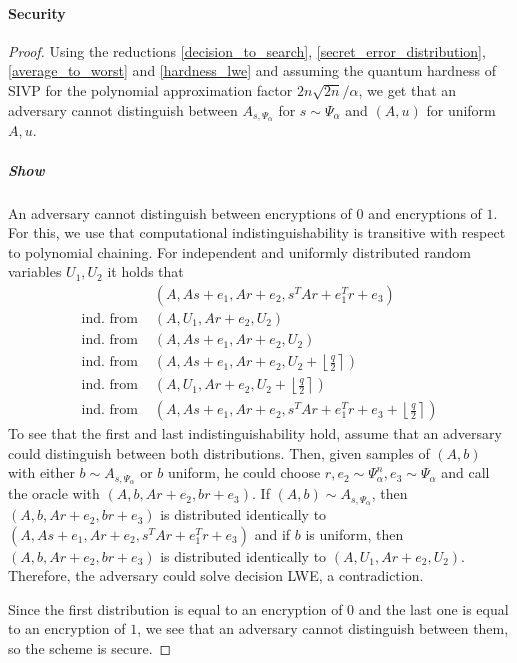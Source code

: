 \documentclass{report}
\begin{document}
\paragraph{Security}
\begin{proof}
Using the reductions \ref{decision_to_search}, \ref{secret_error_distribution}, \ref{average_to_worst} and \ref{hardness_lwe} and assuming the quantum hardness of SIVP for the polynomial approximation factor $2n\sqrt{2n}/\alpha$, we get that an adversary cannot distinguish between $A_{s, \Psi_\alpha}$ for $s \sim \Psi_\alpha$ and $(A, u)$ for uniform $A, u$.
\subparagraph{Show} An adversary cannot distinguish between encryptions of $0$ and encryptions of $1$. For this, we use that computational indistinguishability is transitive with respect to polynomial chaining. For independent and uniformly distributed random variables $U_1, U_2$ it holds that
\begin{equation}
\begin{split}
&\left(A, As + e_1, Ar + e_2, s^TAr + e_1^Tr + e_3 \right) \\
\text{ind. from } & \left(A, U_1, Ar + e_2, U_2 \right) \\
\text{ind. from } & \left(A, As + e_1, Ar + e_2, U_2 \right) \\
\text{ind. from } & \left(A, As + e_1, Ar + e_2, U_2 + \left\lfloor \frac q 2 \right\rceil \right) \\
\text{ind. from } & \left(A, U_1, Ar + e_2, U_2 + \left\lfloor \frac q 2 \right\rceil \right) \\
\text{ind. from } & \left(A, As + e_1, Ar + e_2, s^TAr + e_1^Tr + e_3 + \left\lfloor \frac q 2 \right\rceil \right)
\end{split} \nonumber
\end{equation}
To see that the first and last indistinguishability hold, assume that an adversary could distinguish between both distributions. Then, given samples of $(A, b)$ with either $b \sim A_{s, \Psi_\alpha}$ or $b$ uniform, he could choose $r, e_2 \sim \Psi_\alpha^n, e_3 \sim \Psi_\alpha$ and call the oracle with $(A, b, Ar + e_2, br + e_3)$. If $(A, b) \sim A_{s, \Psi_\alpha}$, then $(A, b, Ar + e_2, br + e_3)$ is distributed identically to $(A, As + e_1, Ar + e_2, s^TAr + e_1^Tr + e_3)$ and if $b$ is uniform, then $(A, b, Ar + e_2, br + e_3)$ is distributed identically to $(A, U_1, Ar + e_2, U_2)$. Therefore, the adversary could solve decision LWE, a contradiction.

Since the first distribution is equal to an encryption of $0$ and the last one is equal to an encryption of $1$, we see that an adversary cannot distinguish between them, so the scheme is secure. \qedhere
\end{proof}
\end{document}
